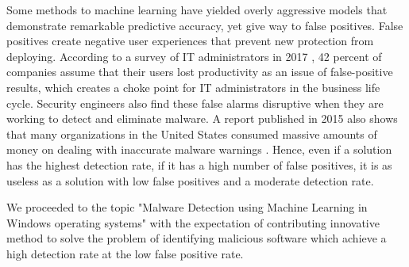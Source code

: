 Some methods to machine learning have yielded overly aggressive models that demonstrate remarkable predictive accuracy, yet give way to false positives. 
False positives create negative user experiences that prevent new protection from deploying. According to a survey of IT administrators in 2017 \cite{jonathan2017survey}, 42 percent of companies assume that their users lost productivity as an issue of false-positive results, which creates a choke point for IT administrators in the business life cycle. 
Security engineers also find these false alarms disruptive when they are working to detect and eliminate malware. A report published in 2015 also shows that many organizations in the United States consumed massive amounts of money on dealing with inaccurate malware warnings \cite{eduard2015false}. 
Hence, even if a solution has the highest detection rate, if it has a high number of false positives, it is as useless as a solution with low false positives and a moderate detection rate.

We proceeded to the topic "Malware Detection using Machine Learning in Windows operating systems" with the expectation of contributing innovative method to solve the problem of identifying malicious software which achieve a high detection rate at the low false positive rate.